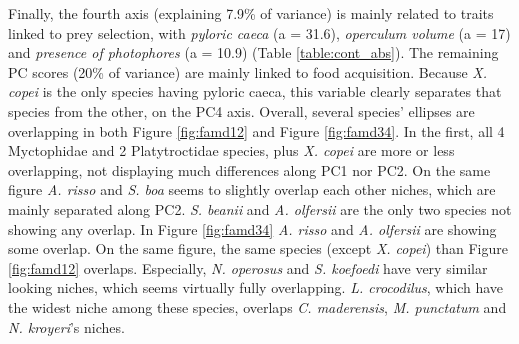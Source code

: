 Finally, the fourth axis (explaining 7.9\% of variance) is mainly related to traits linked to prey selection, with \emph{pyloric caeca} (a = 31.6), \emph{operculum volume} (a = 17) and \emph{presence of photophores} (a = 10.9) (Table \ref{table:cont_abs}). The remaining PC scores (20\% of variance) are mainly linked to food acquisition. Because \textit{X. copei} is the only species having pyloric caeca, this variable clearly separates that species from the other, on the PC4 axis.
Overall, several species' ellipses are overlapping in both Figure \ref{fig:famd12} and Figure \ref{fig:famd34}. In the first, all 4 Myctophidae and 2 Platytroctidae species, plus \textit{X. copei} are more or less overlapping, not displaying much differences along PC1 nor PC2. On the same figure \textit{A. risso} and \textit{S. boa} seems to slightly overlap each other niches, which are mainly separated along PC2. \textit{S. beanii} and \textit{A. olfersii} are the only two species not showing any overlap. 
In Figure \ref{fig:famd34} \textit{A. risso} and \textit{A. olfersii} are showing some overlap. On the same figure, the same species (except \textit{X. copei}) than Figure \ref{fig:famd12} overlaps. Especially, \textit{N. operosus} and \textit{S. koefoedi} have very similar looking niches, which seems virtually fully overlapping. \textit{L. crocodilus}, which have the widest niche among these species, overlaps \textit{C. maderensis}, \textit{M. punctatum} and \textit{N. kroyeri}'s niches. 


